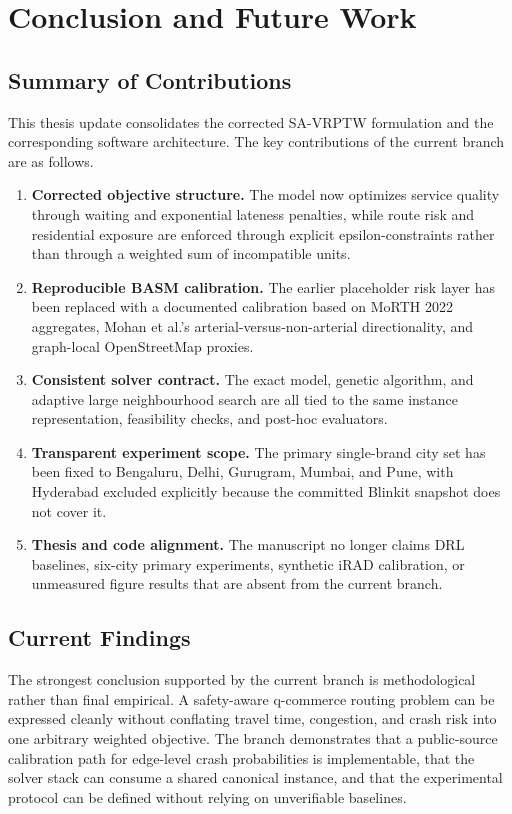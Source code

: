 \chapter{Conclusion and Future Work}

\section{Summary of Contributions}

This thesis update consolidates the corrected SA-VRPTW formulation and the corresponding software architecture. The key contributions of the current branch are as follows.

\begin{enumerate}
    \item \textbf{Corrected objective structure.} The model now optimizes service quality through waiting and exponential lateness penalties, while route risk and residential exposure are enforced through explicit epsilon-constraints rather than through a weighted sum of incompatible units.
    \item \textbf{Reproducible BASM calibration.} The earlier placeholder risk layer has been replaced with a documented calibration based on MoRTH 2022 aggregates, Mohan et al.'s arterial-versus-non-arterial directionality, and graph-local OpenStreetMap proxies.
    \item \textbf{Consistent solver contract.} The exact model, genetic algorithm, and adaptive large neighbourhood search are all tied to the same instance representation, feasibility checks, and post-hoc evaluators.
    \item \textbf{Transparent experiment scope.} The primary single-brand city set has been fixed to Bengaluru, Delhi, Gurugram, Mumbai, and Pune, with Hyderabad excluded explicitly because the committed Blinkit snapshot does not cover it.
    \item \textbf{Thesis and code alignment.} The manuscript no longer claims DRL baselines, six-city primary experiments, synthetic iRAD calibration, or unmeasured figure results that are absent from the current branch.
\end{enumerate}

\section{Current Findings}

The strongest conclusion supported by the current branch is methodological rather than final empirical. A safety-aware q-commerce routing problem can be expressed cleanly without conflating travel time, congestion, and crash risk into one arbitrary weighted objective. The branch demonstrates that a public-source calibration path for edge-level crash probabilities is implementable, that the solver stack can consume a shared canonical instance, and that the experimental protocol can be defined without relying on unverifiable baselines.

